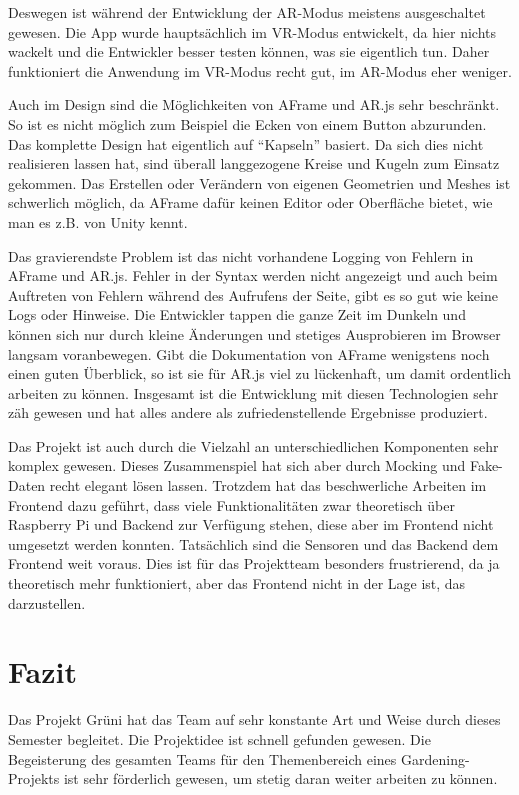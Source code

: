 Deswegen ist während der Entwicklung der AR-Modus meistens ausgeschaltet
gewesen. Die App wurde hauptsächlich im VR-Modus entwickelt, da hier
nichts wackelt und die Entwickler besser testen können, was sie
eigentlich tun. Daher funktioniert die Anwendung im VR-Modus recht gut,
im AR-Modus eher weniger.

Auch im Design sind die Möglichkeiten von AFrame und AR.js sehr
beschränkt. So ist es nicht möglich zum Beispiel die Ecken von einem
Button abzurunden. Das komplette Design hat eigentlich auf ``Kapseln''
basiert. Da sich dies nicht realisieren lassen hat, sind überall
langgezogene Kreise und Kugeln zum Einsatz gekommen. Das Erstellen oder
Verändern von eigenen Geometrien und Meshes ist schwerlich möglich, da
AFrame dafür keinen Editor oder Oberfläche bietet, wie man es z.B. von
Unity kennt.

Das gravierendste Problem ist das nicht vorhandene Logging von Fehlern
in AFrame und AR.js. Fehler in der Syntax werden nicht angezeigt und
auch beim Auftreten von Fehlern während des Aufrufens der Seite, gibt es
so gut wie keine Logs oder Hinweise. Die Entwickler tappen die ganze
Zeit im Dunkeln und können sich nur durch kleine Änderungen und stetiges
Ausprobieren im Browser langsam voranbewegen. Gibt die Dokumentation von
AFrame wenigstens noch einen guten Überblick, so ist sie für AR.js viel
zu lückenhaft, um damit ordentlich arbeiten zu können. Insgesamt ist die
Entwicklung mit diesen Technologien sehr zäh gewesen und hat alles
andere als zufriedenstellende Ergebnisse produziert.

Das Projekt ist auch durch die Vielzahl an unterschiedlichen Komponenten
sehr komplex gewesen. Dieses Zusammenspiel hat sich aber durch Mocking
und Fake-Daten recht elegant lösen lassen. Trotzdem hat das
beschwerliche Arbeiten im Frontend dazu geführt, dass viele
Funktionalitäten zwar theoretisch über Raspberry Pi und Backend zur
Verfügung stehen, diese aber im Frontend nicht umgesetzt werden konnten.
Tatsächlich sind die Sensoren und das Backend dem Frontend weit voraus.
Dies ist für das Projektteam besonders frustrierend, da ja theoretisch
mehr funktioniert, aber das Frontend nicht in der Lage ist, das
darzustellen.

\hypertarget{fazit}{%
\section{Fazit}\label{fazit}}

Das Projekt Grüni hat das Team auf sehr konstante Art und Weise durch
dieses Semester begleitet. Die Projektidee ist schnell gefunden gewesen.
Die Begeisterung des gesamten Teams für den Themenbereich eines
Gardening-Projekts ist sehr förderlich gewesen, um stetig daran weiter
arbeiten zu können.

